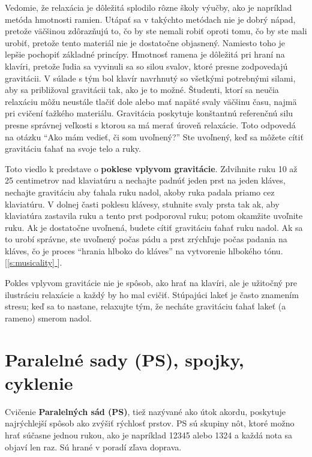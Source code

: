 \documentclass[11pt,a4paper]{book}
\newcommand*{\fullref}[1]{\hyperref[{#1}]{\ref*{#1} \nameref*{#1}}} %
\newcommand*{\fullrefp}[1]{[\fullref{#1}]} %
\begin{document}
Vedomie, že relaxácia je dôležitá splodilo rôzne školy výučby, ako je napríklad metóda hmotnosti ramien. Utápať sa v takýchto metódach nie je dobrý nápad, pretože väčšinou zdôrazňujú to, čo by ste nemali robiť oproti tomu, čo by ste mali urobiť, pretože tento materiál nie je dostatočne objasnený. Namiesto toho je lepšie pochopiť základné princípy. Hmotnosť ramena je dôležitá pri hraní na klavíri, pretože ľudia sa vyvinuli sa so silou svalov, ktoré presne zodpovedajú gravitácii. V súlade s tým bol klavír navrhnutý so všetkými potrebnými silami, aby sa približoval gravitácii tak, ako je to možné. Študenti, ktorí sa neučia relaxáciu môžu neustále tlačiť dole alebo mať napäté svaly väčšinu času, najmä pri cvičení ťažkého materiálu. Gravitácia poskytuje konštantnú referenčnú silu presne správnej veľkosti s ktorou sa má merať úroveň relaxácie. Toto odpovedá na otázku “Ako mám vedieť, či som uvoľnený?” Ste uvoľnený, keď sa môžete cítiť gravitáciu ťahať na svoje telo a ruky.

Toto viedlo k predstave o \textbf{poklese vplyvom gravitácie}. Zdvihnite ruku 10 až 25 centimetrov nad klaviatúru a nechajte padnúť jeden prst na jeden kláves, nechajte gravitáciu aby ťahala ruku nadol, akoby ruka padala priamo cez klaviatúru. V dolnej časti poklesu klávesy, stuhnite svaly prsta tak ak, aby klaviatúra zastavila ruku a tento prst podporoval ruku; potom okamžite uvoľnite ruku. Ak je dostatočne uvoľnená, budete cítiť gravitáciu ťahať ruku nadol. Ak sa to urobí správne, ste uvoľnený počas pádu a prst zrýchľuje počas padania na kláves, čo je  proces “hrania hlboko do kláves” na vytvorenie hlbokého tónu. \fullrefp{s:musicality}.

Pokles vplyvom gravitácie nie je spôsob, ako hrať na klavíri, ale je užitočný pre ilustráciu relaxácie a každý by ho mal cvičiť. Stúpajúci lakeť je často znamením stresu; keď sa to nastane, relaxujte tým, že necháte gravitáciu ťahať lakeť (a rameno) smerom nadol.

\section{Paralelné sady (PS), spojky, cyklenie}\label{s:parallel-sets}
Cvičenie \textbf{Paralelných sád (PS)}, tiež nazývané ako útok akordu, poskytuje najrýchlejší spôsob ako zvýšiť rýchlosť prstov. PS sú skupiny nôt, ktoré možno hrať súčasne jednou rukou, ako je napríklad 12345 alebo 1324 a každá nota sa objaví len raz. Sú hrané v poradí zľava doprava.
\end{document}
